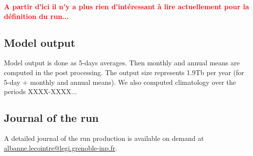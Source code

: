\textcolor{red}{\textbf{A partir d'ici il n'y a plus rien d'int\'eressant \`a lire actuellement pour la d\'efinition du run...}}

\subsection{Model output}

Model output is done as 5-days averages. Then monthly and annual means are computed in the post processing. 
The output size represents 1.9Tb per year (for 5-day + monthly and annual means). 
We also computed climatology over the periods XXXX-XXXX...

\subsection{Journal of the run}

A detailed journal of the run production is available on demand at \href{mailto:albanne.lecointre@legi.grenoble-inp.fr}{albanne.lecointre@legi.grenoble-inp.fr}.

